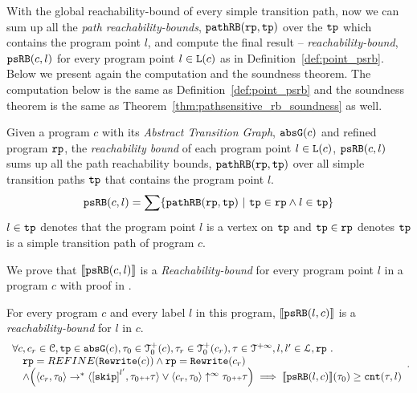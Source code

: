 With the global reachability-bound of every simple transition path, now we can sum up all the \emph{path reachability-bounds}, $\mathtt{pathRB}(\mathtt{rp}, \mathtt{tp})$ over the $\mathtt{tp}$ which contains the program point $l$, and compute the final result -- \emph{reachability-bound}, $\mathtt{psRB}(c, l)$ for every program point $l \in \mathtt{L}(c)$ as in Definition~\ref{def:point_psrb}.
Below we present again the computation and the soundness theorem.
The computation below is the same as Definition~\ref{def:point_psrb}
and the soundness theorem is the same as Theorem~\ref{thm:pathsensitive_rb_soundness} as well.
 \begin{definition}
  Given a program $c$ with its \emph{Abstract Transition Graph}, $\mathtt{abs}{\mathtt{G}}(c)$ and refined program $\mathtt{rp}$,
  the \emph{reachability bound} of each program point $l \in \mathtt{L}(c)$, $\mathtt{psRB}(c, l)$ 
  sums up all the path reachability bounds, $\mathtt{pathRB}(\mathtt{rp}, \mathtt{tp})$ over all simple transition paths $\mathtt{tp}$ that contains the program point $l$.
  \[ 
    \psRB(c, l) = 
    \sum
    \left\{ \inoutB(\rprog, \tpath) ~\vert~ \tpath \in \rprog \land 
    l \in \tpath \right\}
  \]
  $l \in \mathtt{tp}$ denotes that the program point $l$ is a vertex on $\mathtt{tp}$ 
  and $\mathtt{tp} \in \mathtt{rp}$ denotes $\mathtt{tp}$ is a simple transition path of program $c$.
 \end{definition}
We prove that $\llbracket \mathtt{psRB}(c, l) \rrbracket$ is a \emph{Reachability-bound} for every program point $l$ in a program $c$ with proof in .
\begin{theorem}
  For every program ${c}$ and every label $l$ in this program,
  $\llbracket \mathtt{psRB}(l, c) \rrbracket$ is a \emph{reachability-bound} for $l$ in $c$.
  \[
   \begin{array}{l}
   \forall c, c_r \in \cdom, \tpath \in \absG(c), \trace_0 \in \ftdom_0(c), \trace_r \in \ftdom_0(c_r), \trace \in \tdom, l, l' \in \ldom, \rprog \st 
   \\ \quad
   \rprog = REFINE(\algrewrite(c))
   \land 
   \rprog = \algrewrite(c_r)
   \\ \quad
   \land
   \Big(
   \config{c_r, \trace_0} \rightarrow^* \config{\clabel{\eskip}^{l'}, \trace_0 \tracecat \trace}
   \lor \config{c_r, \trace_0} \uparrow^{\infty} \trace_0 \tracecat \trace 
   \Big)
   \implies \econfig{\psRB(l, c)}(\trace_0) \geq \counter(\trace, l)
   \end{array}.
  \]
\end{theorem}
